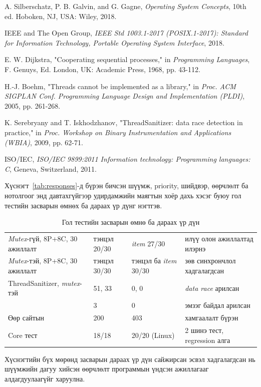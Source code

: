 \documentclass[12pt,a4paper]{article}
\newcommand{\term}[1]{\textit{#1}} %
\begin{document}
\begin{enumerate}[label={[\arabic*]},leftmargin=2.2em,itemsep=4pt]
  \item A. Silberschatz, P. B. Galvin, and G. Gagne, \textit{Operating System Concepts}, 10th ed. Hoboken, NJ, USA: Wiley, 2018.
  \item IEEE and The Open Group, \textit{IEEE Std 1003.1-2017 (POSIX.1-2017): Standard for Information Technology, Portable Operating System Interface}, 2018.
  \item E. W. Dijkstra, "Cooperating sequential processes," in \textit{Programming Languages}, F. Genuys, Ed. London, UK: Academic Press, 1968, pp. 43-112.
  \item H.-J. Boehm, "Threads cannot be implemented as a library," in \textit{Proc. ACM SIGPLAN Conf. Programming Language Design and Implementation (PLDI)}, 2005, pp. 261-268.
  \item K. Serebryany and T. Iskhodzhanov, "ThreadSanitizer: data race detection in practice," in \textit{Proc. Workshop on Binary Instrumentation and Applications (WBIA)}, 2009, pp. 62-71.
  \item ISO/IEC, \textit{ISO/IEC 9899:2011 Information technology: Programming languages: C}, Geneva, Switzerland, 2011.
\end{enumerate}

Хүснэгт~\ref{tab:responses}-д бүрэн бичсэн шүүмж, priority, шийдвэр, өөрчлөлт ба нотолгоог энд давтахгүйгээр удирдамжийн маягтын хоёр дахь хэсэг буюу гол тестийн засварын өмнөх ба дараах үр дүнг нэгтгэв.

\begin{table}[H]\centering\small
\caption{Гол тестийн засварын өмнө ба дараах үр дүн}\label{tab:appendix}
\begin{tabular}{|L{0.3\textwidth}|L{0.2\textwidth}|L{0.24\textwidth}|L{0.26\textwidth}|}\hline
{} &  &  &  \\\hline
\term{Mutex}-гүй, 8P+8C, 30 ажиллалт & тэнцэл 20/30 & \term{item} 27/30 & илүү олон ажиллалтад илэрнэ \\\hline
\term{Mutex}-тэй, 8P+8C, 30 ажиллалт & тэнцэл 30/30 & тэнцэл ба \term{item} 30/30 & зөв синхрончлол хадгалагдсан \\\hline
ThreadSanitizer, \term{mutex}-тэй & 51, 33 & 0, 0 & \term{data race} арилсан \\\hline
{} & 3 & 0 & эмзэг байдал арилсан \\\hline
Өөр сайтын  & 200 & 403 & хамгаалалт бүрэн \\\hline
Core тест & 18/18 & 20/20 (Linux) & 2 шинэ тест, regression алга \\\hline
\end{tabular}
\end{table}

Хүснэгтийн бүх мөрөнд засварын дараах үр дүн сайжирсан эсвэл хадгалагдсан нь шүүмжийн дагуу хийсэн өөрчлөлт программын үндсэн ажиллагааг алдагдуулаагүйг харуулна.
\end{document}

